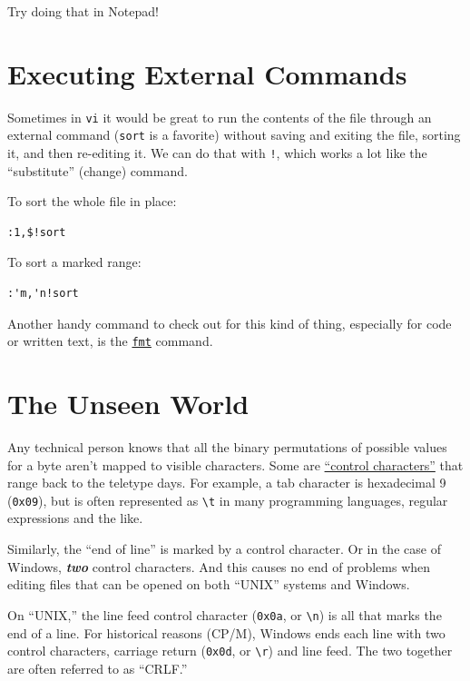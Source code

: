 \documentclass[10pt,]{book}
\numberwithin{figure}{chapter}
\begin{document}
Try doing that in Notepad!

\section{Executing External Commands}\label{executing-external-commands}

Sometimes in \texttt{vi} it would be great to run the contents of the
file through an external command (\texttt{sort} is a favorite) without
saving and exiting the file, sorting it, and then re-editing it. We can
do that with \texttt{!}, which works a lot like the ``substitute''
(change) command.

To sort the whole file in place:

\begin{verbatim}
:1,$!sort
\end{verbatim}

To sort a marked range:

\begin{verbatim}
:'m,'n!sort
\end{verbatim}

Another handy command to check out for this kind of thing, especially
for code or written text, is the
\href{http://linux.die.net/man/1/fmt}{\texttt{fmt}} command.

\section{The Unseen World}\label{the-unseen-world}

Any technical person knows that all the binary permutations of possible
values for a byte aren't mapped to visible characters. Some are
\href{https://en.wikipedia.org/wiki/Control_character}{``control
characters''} that range back to the teletype days. For example, a tab
character is hexadecimal 9 (\texttt{0x09}), but is often represented as
\texttt{\textbackslash{}t} in many programming languages, regular
expressions and the like.

Similarly, the ``end of line'' is marked by a control character. Or in
the case of Windows, \textbf{\emph{two}} control characters. And this
causes no end of problems when editing files that can be opened on both
``UNIX'' systems and Windows.

On ``UNIX,'' the line feed control character (\texttt{0x0a}, or
\texttt{\textbackslash{}n}) is all that marks the end of a line. For
historical reasons (CP/M), Windows ends each line with two control
characters, carriage return (\texttt{0x0d}, or
\texttt{\textbackslash{}r}) and line feed. The two together are often
referred to as ``CRLF.''
\end{document}
